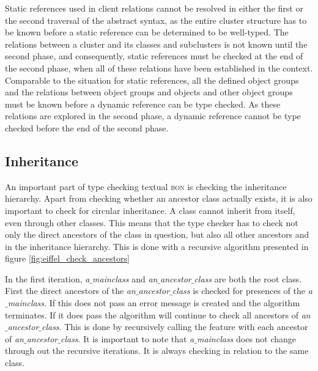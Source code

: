 Static references used in client relations cannot be resolved in either the first or the second traversal of the abstract syntax, as the entire cluster structure has to be known before a static reference can be determined to be well-typed. The relations between a cluster and its classes and subclusters is not known until the second phase, and consequently, static references must be checked at the end of the second phase, when all of these relations have been established in the context.
Comparable to the situation for static references, all the defined object groups and the relations between object groups and objects and other object groups must be known before a dynamic reference can be type checked. As these relations are explored in the second phase, a dynamic reference cannot be type checked before the end of the second phase.

\subsection{Inheritance}
An important part of type checking textual \textsc{bon} is checking the inheritance hierarchy. Apart from checking whether an ancestor class actually exists, it is also important to check for circular inheritance. A class cannot inherit from itself, even through other classes. This means that the type checker has to check not only the direct ancestors of the class in question, but also all other ancestors and in the inheritance hierarchy. This is done with a recursive algorithm presented in figure \ref{fig:eiffel_check_ancestors}

In the first iteration, \textit{a$\_$main}\textunderscore\textit{class} and \textit{an$\_$ancestor$\_$class} are both the root class. First the direct ancestors of the \textit{an$\_$ancestor$\_$class}   is checked for presences of the \textit{a$\_$main}\textunderscore\textit{class}. If this does not pass an error message is created and the algorithm terminates. If it does pass the algorithm will continue to check all ancestors of \textit{an$\_$ancestor$\_$class}. This is done by recursively calling the feature with each ancestor of \textit{an$\_$ancestor$\_$class}. It is important to note that \textit{a$\_$main}\textunderscore\textit{class} does not change through out the recursive iterations. It is always checking in relation to the same class.

